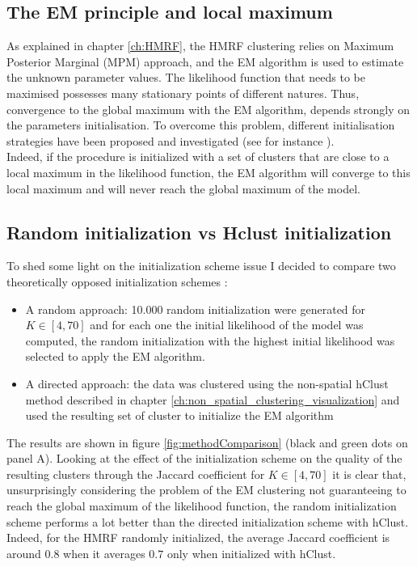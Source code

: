 	\subsection{The EM principle and local maximum}
As explained in chapter \ref{ch:HMRF}, the HMRF clustering relies on Maximum Posterior Marginal (MPM) approach, and the EM algorithm is used to estimate the unknown parameter values. The likelihood function that needs to be maximised possesses many stationary points of different natures. Thus, convergence to the global maximum with the EM algorithm, depends strongly on the parameters initialisation. To overcome this problem, different initialisation strategies have been proposed and investigated (see for instance \cite{biernacki03,karlis03,mclachlan04}).\\

Indeed, if the procedure is initialized with a set of clusters that are close to a local maximum in the likelihood function, the EM algorithm will converge to this local maximum and will never reach the global maximum of the model.

	\subsection{Random initialization vs Hclust initialization}
	To shed some light on the initialization scheme issue I decided to compare two theoretically opposed initialization schemes :
\begin{itemize}
	\item A random approach: 10.000 random initialization were generated for $K \in [4,70]$ and for each one the initial likelihood of the model was computed, the random initialization with the highest initial likelihood was selected to apply the EM algorithm.
	\item A directed approach: the data was clustered using the non-spatial hClust method described in chapter \ref{ch:non_spatial_clustering_visualization} and used the resulting set of cluster to initialize the EM algorithm
\end{itemize}

The results are shown in figure \ref{fig:methodComparison} (black and green dots on panel A). Looking at the effect of the initialization scheme on the quality of the resulting clusters through the Jaccard coefficient for $K \in [4,70]$ it is clear that, unsurprisingly considering the problem of the EM clustering not guaranteeing to reach the global maximum of the likelihood function, the random initialization scheme performs a lot better than the directed initialization scheme with hClust. Indeed, for the HMRF randomly initialized, the average Jaccard coefficient is around $0.8$ when it averages $0.7$ only when initialized with hClust.\\

